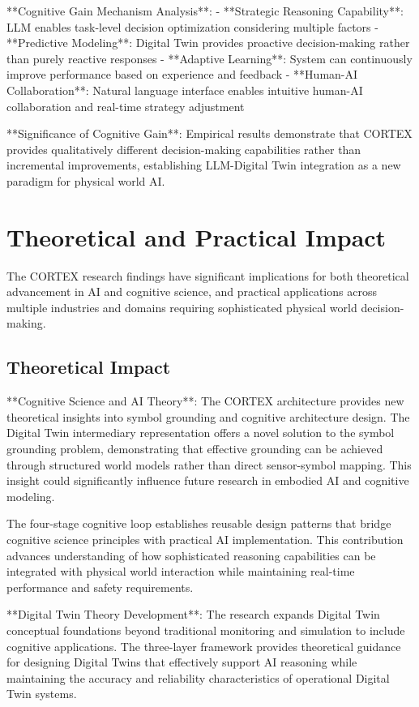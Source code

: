 **Cognitive Gain Mechanism Analysis**:
- **Strategic Reasoning Capability**: LLM enables task-level decision optimization considering multiple factors
- **Predictive Modeling**: Digital Twin provides proactive decision-making rather than purely reactive responses
- **Adaptive Learning**: System can continuously improve performance based on experience and feedback
- **Human-AI Collaboration**: Natural language interface enables intuitive human-AI collaboration and real-time strategy adjustment

**Significance of Cognitive Gain**: Empirical results demonstrate that CORTEX provides qualitatively different decision-making capabilities rather than incremental improvements, establishing LLM-Digital Twin integration as a new paradigm for physical world AI.

\section{Theoretical and Practical Impact}

The CORTEX research findings have significant implications for both theoretical advancement in AI and cognitive science, and practical applications across multiple industries and domains requiring sophisticated physical world decision-making.

\subsection{Theoretical Impact}

**Cognitive Science and AI Theory**:
The CORTEX architecture provides new theoretical insights into symbol grounding and cognitive architecture design. The Digital Twin intermediary representation offers a novel solution to the symbol grounding problem, demonstrating that effective grounding can be achieved through structured world models rather than direct sensor-symbol mapping. This insight could significantly influence future research in embodied AI and cognitive modeling.

The four-stage cognitive loop establishes reusable design patterns that bridge cognitive science principles with practical AI implementation. This contribution advances understanding of how sophisticated reasoning capabilities can be integrated with physical world interaction while maintaining real-time performance and safety requirements.

**Digital Twin Theory Development**:
The research expands Digital Twin conceptual foundations beyond traditional monitoring and simulation to include cognitive applications. The three-layer framework provides theoretical guidance for designing Digital Twins that effectively support AI reasoning while maintaining the accuracy and reliability characteristics of operational Digital Twin systems.


